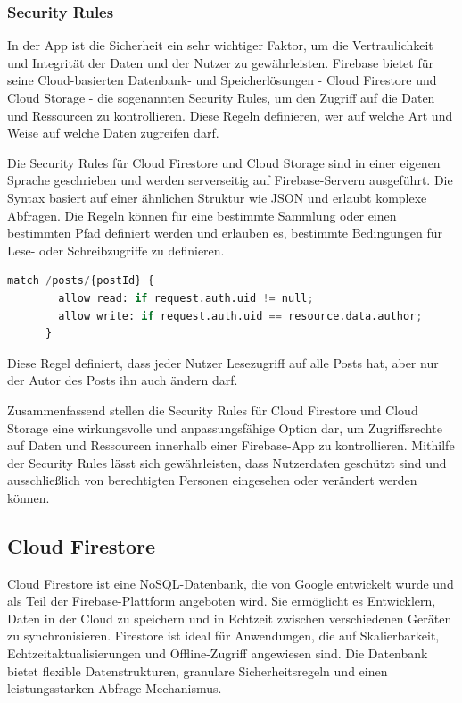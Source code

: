 \subsubsection{Security Rules}\label{sec:security-rules}
In der App ist die Sicherheit ein sehr wichtiger Faktor,
um die Vertraulichkeit und Integrität der Daten und der
Nutzer zu gewährleisten. Firebase bietet für seine
Cloud-basierten Datenbank- und Speicherlösungen - Cloud
Firestore und Cloud Storage - die sogenannten Security
Rules\cite{firebase-rules-docs}\cite{firestore-rules-firestore-nochba}\cite{storage-rules-storage-nochba}, um den Zugriff auf
die Daten und Ressourcen zu kontrollieren. Diese Regeln
definieren, wer auf welche Art und Weise auf welche Daten
zugreifen darf.

Die Security Rules für Cloud Firestore und Cloud Storage sind in einer eigenen Sprache geschrieben und werden serverseitig auf Firebase-Servern ausgeführt. Die Syntax basiert auf einer ähnlichen Struktur wie JSON und erlaubt komplexe Abfragen. Die Regeln können für eine bestimmte Sammlung oder einen bestimmten Pfad definiert werden und erlauben es, bestimmte Bedingungen für Lese- oder Schreibzugriffe zu definieren.


\begin{lstlisting}[language=Python,caption=Security Rules Beispiel]
    match /posts/{postId} {
        allow read: if request.auth.uid != null;
        allow write: if request.auth.uid == resource.data.author;
      }
\end{lstlisting}

Diese Regel definiert, dass jeder Nutzer Lesezugriff auf
alle Posts hat, aber nur der Autor des Posts ihn auch ändern
darf.

Zusammenfassend stellen die Security Rules für Cloud Firestore und Cloud Storage eine wirkungsvolle und anpassungsfähige Option dar, um Zugriffsrechte auf Daten und Ressourcen innerhalb einer Firebase-App zu kontrollieren. Mithilfe der Security Rules lässt sich gewährleisten, dass Nutzerdaten geschützt sind und ausschließlich von berechtigten Personen eingesehen oder verändert werden können.



\subsection{Cloud Firestore}

Cloud Firestore ist eine NoSQL-Datenbank, die von Google entwickelt wurde und als Teil der Firebase-Plattform angeboten wird. Sie ermöglicht es Entwicklern, Daten in der Cloud zu speichern und in Echtzeit zwischen verschiedenen Geräten zu synchronisieren. Firestore ist ideal für Anwendungen, die auf Skalierbarkeit, Echtzeitaktualisierungen und Offline-Zugriff angewiesen sind. Die Datenbank bietet flexible Datenstrukturen, granulare Sicherheitsregeln und einen leistungsstarken Abfrage-Mechanismus.

